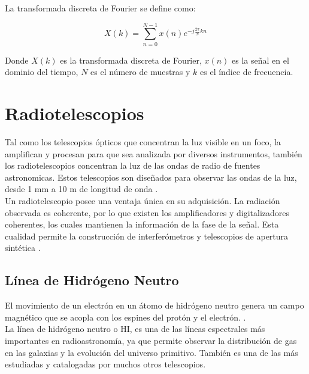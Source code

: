 La transformada discreta de Fourier se define como:

\begin{equation}
    X(k) = \sum_{n=0}^{N-1} x(n)e^{-j\frac{2\pi}{N}kn}
\end{equation}

Donde $X(k)$ es la transformada discreta de Fourier, $x(n)$ es la señal en el dominio del tiempo, $N$ es el número de muestras y $k$ es el índice de frecuencia.\\




\section{Radiotelescopios}

Tal como los telescopios ópticos que concentran la luz visible en un foco, la amplifican y procesan para que sea analizada por diversos instrumentos, también los radiotelescopios concentran la luz de las ondas de radio de fuentes astronomicas. Estos telescopios son diseñados para observar las ondas de la luz, desde 1 mm a 10 m de longitud de onda \cite{nraoRadioTelescopes}.\\

Un radiotelescopio posee una ventaja única en su adquisición. La radiación observada es coherente, por lo que existen los amplificadores y digitalizadores coherentes, los cuales mantienen la información de la fase de la señal. Esta cualidad permite la construcción de interferómetros y telescopios de apertura sintética \cite{Ransom2016}.\\ 

\subsection{Línea de Hidrógeno Neutro}

El movimiento de un electrón en un átomo de hidrógeno neutro genera un campo magnético que se acopla con los espines del protón y el electrón.  \cite{Restrepo2023}.\\

La línea de hidrógeno neutro o HI, es una de las líneas espectrales más importantes en radioastronomía, ya que permite observar la distribución de gas en las galaxias y la evolución del universo primitivo. También es una de las más estudiadas y catalogadas por muchos otros telescopios.\\

